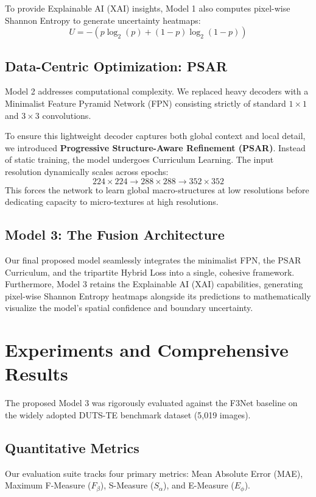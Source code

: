 \documentclass[10pt,conference,twocolumn]{IEEEtran}
\begin{document}
To provide Explainable AI (XAI) insights, Model 1 also computes pixel-wise Shannon Entropy to generate uncertainty heatmaps:
\begin{equation}
    U = - (p \log_2(p) + (1-p) \log_2(1-p))
\end{equation}

\subsection{Data-Centric Optimization: PSAR}
Model 2 addresses computational complexity. We replaced heavy decoders with a Minimalist Feature Pyramid Network (FPN) consisting strictly of standard $1\times1$ and $3\times3$ convolutions. 

To ensure this lightweight decoder captures both global context and local detail, we introduced \textbf{Progressive Structure-Aware Refinement (PSAR)}. Instead of static training, the model undergoes Curriculum Learning. The input resolution dynamically scales across epochs:
\begin{equation}
    224 \times 224 \rightarrow 288 \times 288 \rightarrow 352 \times 352
\end{equation}
This forces the network to learn global macro-structures at low resolutions before dedicating capacity to micro-textures at high resolutions.

\subsection{Model 3: The Fusion Architecture}
Our final proposed model seamlessly integrates the minimalist FPN, the PSAR Curriculum, and the tripartite Hybrid Loss into a single, cohesive framework. Furthermore, Model 3 retains the Explainable AI (XAI) capabilities, generating pixel-wise Shannon Entropy heatmaps alongside its predictions to mathematically visualize the model's spatial confidence and boundary uncertainty.

\section{Experiments and Comprehensive Results}
The proposed Model 3 was rigorously evaluated against the F3Net baseline on the widely adopted DUTS-TE benchmark dataset (5,019 images).

\subsection{Quantitative Metrics}
Our evaluation suite tracks four primary metrics: Mean Absolute Error (MAE), Maximum F-Measure ($F_\beta$), S-Measure ($S_\alpha$), and E-Measure ($E_\phi$).
\end{document}
